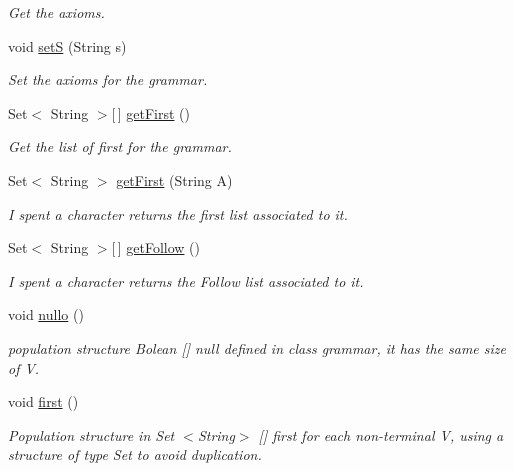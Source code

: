 \begin{DoxyCompactItemize}
\begin{DoxyCompactList}\small\item\em Get the axioms. \end{DoxyCompactList}\item 
void \hyperlink{classcontext_free_1_1grammar_1_1_context_free_grammar_a2f4c3ec7270d799ed127cb162e0213b3}{set\-S} (String s)
\begin{DoxyCompactList}\small\item\em Set the axioms for the grammar. \end{DoxyCompactList}\item 
Set$<$ String $>$\mbox{[}$\,$\mbox{]} \hyperlink{classcontext_free_1_1grammar_1_1_context_free_grammar_adc3a25917132474960be34329cdaead9}{get\-First} ()
\begin{DoxyCompactList}\small\item\em Get the list of first for the grammar. \end{DoxyCompactList}\item 
Set$<$ String $>$ \hyperlink{classcontext_free_1_1grammar_1_1_context_free_grammar_a2140cdc636585e9714e8dc42c936eee5}{get\-First} (String A)
\begin{DoxyCompactList}\small\item\em I spent a character returns the first list associated to it. \end{DoxyCompactList}\item 
Set$<$ String $>$\mbox{[}$\,$\mbox{]} \hyperlink{classcontext_free_1_1grammar_1_1_context_free_grammar_a5dae0e5de95349d310869fb5941cb5be}{get\-Follow} ()
\begin{DoxyCompactList}\small\item\em I spent a character returns the Follow list associated to it. \end{DoxyCompactList}\item 
void \hyperlink{classcontext_free_1_1grammar_1_1_context_free_grammar_ac880ed3ca36ddcd8e20d8279af08244d}{nullo} ()
\begin{DoxyCompactList}\small\item\em population structure Bolean \mbox{[}\mbox{]} null defined in class grammar, it has the same size of V. \end{DoxyCompactList}\item 
void \hyperlink{classcontext_free_1_1grammar_1_1_context_free_grammar_a9c3bfe0b038204420b470fab326ce7bb}{first} ()
\begin{DoxyCompactList}\small\item\em Population structure in Set $<$\-String$>$ \mbox{[}\mbox{]} first for each non-\/terminal V, using a structure of type Set to avoid duplication. \end{DoxyCompactList}\item 

\end{DoxyCompactItemize}

